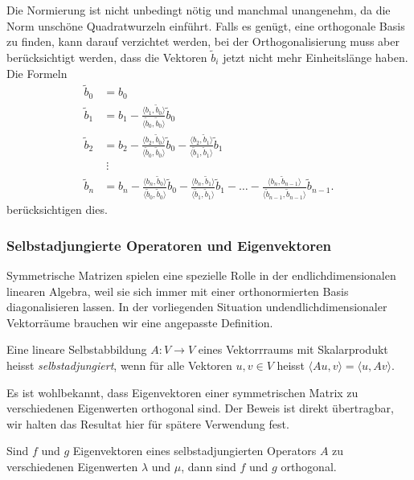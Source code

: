 Die Normierung ist nicht unbedingt nötig und manchmal unangenehm,
da die Norm unschöne Quadratwurzeln einführt.
Falls es genügt, eine orthogonale Basis zu finden, kann darauf
verzichtet werden, bei der Orthogonalisierung muss aber berücksichtigt
werden, dass die Vektoren $\tilde{b}_i$ jetzt nicht mehr Einheitslänge
haben.
Die Formeln
\begin{align*}
\tilde{b}_0
&=
b_0
\\
\tilde{b}_1
&=
b_1
-
\frac{\langle b_1,\tilde{b}_0\rangle}{\langle \tilde{b}_0,\tilde{b}_0\rangle}\tilde{b}_0
\\
\tilde{b}_2
&=
b_2
-
\frac{\langle b_2,\tilde{b}_0\rangle}{\langle \tilde{b}_0,\tilde{b}_0\rangle}\tilde{b}_0
-
\frac{\langle b_2,\tilde{b}_1\rangle}{\langle \tilde{b}_1,\tilde{b}_1\rangle}\tilde{b}_1
\\
&\;\vdots
\\
\tilde{b}_n
&=
b_n
-
\frac{\langle b_n,\tilde{b}_0\rangle}{\langle \tilde{b}_0,\tilde{b}_0\rangle}\tilde{b}_0
-
\frac{\langle b_n,\tilde{b}_1\rangle}{\langle \tilde{b}_1,\tilde{b}_1\rangle}\tilde{b}_1
-
\dots
-
\frac{\langle b_n,\tilde{b}_{n-1}\rangle}{\langle \tilde{b}_{n-1},\tilde{b}_{n-1}\rangle}\tilde{b}_{n-1}.
\end{align*}
berücksichtigen dies.

\subsubsection{Selbstadjungierte Operatoren und Eigenvektoren}
Symmetrische Matrizen spielen eine spezielle Rolle in der
endlichdimensionalen linearen Algebra, weil sie sich immer
mit einer orthonormierten Basis diagonalisieren lassen.
In der vorliegenden Situation undendlichdimensionaler Vektorräume
brauchen wir eine angepasste Definition.

\begin{definition}
Eine lineare Selbstabbildung $A\colon V\to V$
eines Vektorrraums mit Skalarprodukt
heisst {\em selbstadjungiert}, wenn für alle Vektoren $u,v\in V$
heisst $\langle Au,v\rangle = \langle u,Av\rangle$.
\end{definition}

Es ist wohlbekannt, dass Eigenvektoren einer symmetrischen Matrix
zu verschiedenen Eigenwerten orthogonal sind.
Der Beweis ist direkt übertragbar, wir halten das Resultat hier
für spätere Verwendung fest.

\begin{satz}
Sind $f$ und $g$ Eigenvektoren eines selbstadjungierten Operators $A$
zu verschiedenen Eigenwerten $\lambda$ und $\mu$, dann sind $f$ und $g$
orthogonal.
\end{satz}

